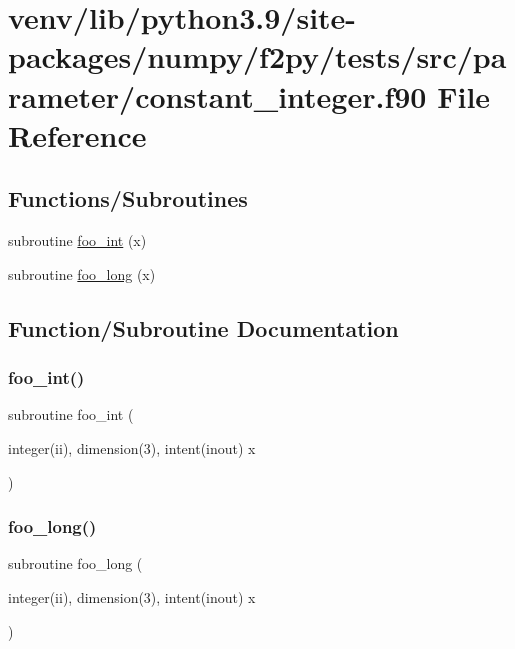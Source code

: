 \hypertarget{constant__integer_8f90}{}\section{venv/lib/python3.9/site-\/packages/numpy/f2py/tests/src/parameter/constant\+\_\+integer.f90 File Reference}
\label{constant__integer_8f90}
\subsection*{Functions/\+Subroutines}
\begin{DoxyCompactItemize}
\item 
subroutine \hyperlink{constant__integer_8f90_a588a6473bffdb96295b20a0388807bf6}{foo\+\_\+int} (x)
\item 
subroutine \hyperlink{constant__integer_8f90_a70c66785847dddcbad62c9f95c5c5a03}{foo\+\_\+long} (x)
\end{DoxyCompactItemize}


\subsection{Function/\+Subroutine Documentation}
\mbox{\label{constant__integer_8f90_a588a6473bffdb96295b20a0388807bf6}} 
\subsubsection{\texorpdfstring{foo\+\_\+int()}{foo\_int()}}
{\footnotesize\ttfamily subroutine foo\+\_\+int (\begin{DoxyParamCaption}\item[{integer(ii), dimension(3), intent(inout)}]{x }\end{DoxyParamCaption})}

\mbox{\label{constant__integer_8f90_a70c66785847dddcbad62c9f95c5c5a03}} 
\subsubsection{\texorpdfstring{foo\+\_\+long()}{foo\_long()}}
{\footnotesize\ttfamily subroutine foo\+\_\+long (\begin{DoxyParamCaption}\item[{integer(ii), dimension(3), intent(inout)}]{x }\end{DoxyParamCaption})}

